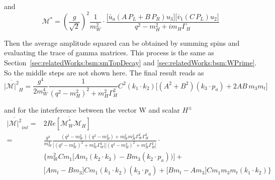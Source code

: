 \noindent and
\begin{equation}
	\mathcal{M}^*  =  (\frac{g }{\sqrt{2}})^2 \frac{1}{m^2_W}  \cdot 
    \frac{ \big[ \bar{u}_a  (A \, P_L + B  \, P_R) u_3 \big] \big[ \bar{v}_1 ( C  \, P_L) u_2 \big]  }{q^2-m^2_{H} + i m_{H} \Gamma_{H}} 
\end{equation}

\noindent Then the average amplitude squared can be obtained by summing spins and evaluating the trace of gamma matrices. This process is the same as Section~\ref{sec:relatedWorks:bsm:smTopDecay} and \ref{sec:relatedWorks:bsm:WPrime}. So the middle steps are not shown here. The final result reads as
\begin{equation}
	\overline{ |\mathcal{M}|^2 }_{H} = \frac{g^4}{2 m^4_W} \frac{1}{ (q^2-m^2_{H})^2 +  m^2_{H} \Gamma^2_{H}} 
    C^2 (k_1 \cdot k_2) \bigg[ (A^2 + B^2) (k_3 \cdot p_a ) + 2 AB \, m_3  m_t\bigg]
\end{equation}


\noindent and for the interference between the vector W and scalar $H^\pm$ 
\begin{equation}
\begin{split}
    \overline{ |\mathcal{M}|^2 } _{int} = &   2 \overline{ Re[\mathcal{M}^*_W \mathcal{M}_{H}] }  \\
    =& \frac{g ^4}{m_W^4} \frac
    {( q^2-m^2_{W}) ( q^2-m^2_{H}) + m^2_{W}  m^2_{H}  \Gamma^2_{W} \Gamma^2_H }
    { \big[ ( q^2-m^2_{W})^2 +  m^2_{W} \Gamma^2_{W} \big] \big[ (  q^2-m^2_{H})^2 +  m^2_{H} \Gamma^2_{H} \big] }  \cdot \\
    & \bigg\{
    m_W^2  C m_1 \big[A  m_t (k_2 \cdot k_3) - B m_3 (k_2 \cdot p_a) ) \big] + \\
    & \big[A m_t - B m_3 \big] C m_1  (k_1 \cdot k_2) (k_3 \cdot p_a)   +  \big[B m_t - A m_3\big]  C m_1 m_3  m_t (k_1 \cdot k_2)  
    \bigg\}
\end{split}
\end{equation}

